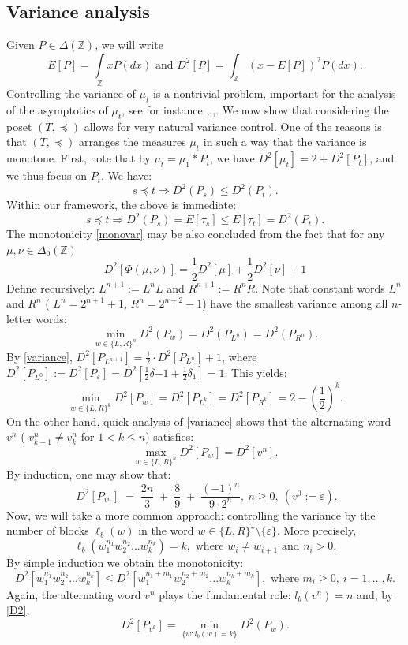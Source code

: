 \documentclass[10pt]{amsart}
\theoremstyle{definition}
\numberwithin{equation}{section}
\newcommand{\dd}{\delta}
\newcommand{\eps}{\varepsilon}
\newcommand{\Z}{\mathbb{Z}}
\begin{document}
\subsection{Variance analysis}
Given $P\in\Delta(\Z)$, we will write 
$$E[P]=\int\limits_{\Z}xP(dx)\mbox{ and }D^2[P]=\int_{\Z}(x-E[P])^2P(dx).$$
Controlling the variance  of $\mu_t$ is a nontrivial problem, important for the analysis of the asymptotics of $\mu_t$, see for instance \cite{drmota},\cite{Emme},\cite{Hosten},\cite{sw2023}. We  now show that considering the poset $(T, \preceq)$ allows for very natural variance control. One of the reasons is that $(T, \preceq)$ arranges the measures $\mu_t$ in such a way that the variance is monotone. First, note that by $\mu_t=\mu_1\ast P_t$, we have $D^2[\mu_t]=2+D^2[P_t]$, and we thus focus on $P_t$.  We have:
\begin{equation}\label{monovar}
s\preceq t \Longrightarrow D^2(P_s)\leq D^2(P_{t}).
\end{equation}
Within our framework, the above is immediate:
$$s\preceq t \Longrightarrow D^2(P_s)=E[\tau_s]\leq E[\tau_{t}]=D^2(P_{t}).$$
The monotonicity \eqref{monovar} may be also concluded from the fact that for any $\mu,\nu\in \Delta_0(\Z)$
\begin{equation}\label{variance}
D^2[\Phi(\mu,\nu)]=\frac12 D^2[\mu]+\frac12 D^2[\nu]+1
\end{equation}
Define recursively: $L^{n+1}:=L^nL$ and $R^{n+1}:=R^nR$. Note that constant words $L^n$ and $R^n$ ( $L^n= 2^{n+1}+1$, $R^n=2^{n+2}-1$)  have the smallest variance among all $n$-letter words:
$$\min\limits_{w\in\{L,R\}^n}D^2(P_{w})=D^2(P_{L^n})=D^2(P_{R^n}).$$
By \eqref{variance}, $D^2[P_{L^{n+1}}]=\frac{1}{2}\cdot D^2[P_{L^n}]+1$, where $D^2[P_{L^0}]:=D^2[P_{\eps}]=D^2[\frac12\dd{-1}+\frac12\dd_1]=1$. This yields:
\begin{equation}\label{minD}
\min\limits_{w\in \{L,R\}^k} D^2[P_w]=D^2[P_{L^k}]=D^2[P_{R^k}]=2-(\frac{1}{2})^{k}.
\end{equation}
On the other hand, quick analysis of \eqref{variance} shows that the alternating word $v^n$ ( $v^n_{k-1}\neq v^n_{k}$ for $1<k\leq n$) satisfies:
$$\max\limits_{w\in \{L,R\}^n} D^2[P_w] =D^2[v^n].$$
By induction, one may show that:
$$
 \; D^2[P_{v^n}] \;=\; \frac{2n}{3} \;+\; \frac{8}{9} \;+\; \frac{(-1)^{n}}{9\cdot 2^{n}},\ n\geq0, \ ( v^0:=\eps). $$
Now, we will take a more common approach: controlling the variance by the number of blocks $\ell_b(w)$ in the word $w\in\{L,R\}^\star\setminus\{\eps\}$. More precisely, 
$$\ell_b(w_1^{n_1}w_2^{n_2}...w_k^{n_k})=k,\mbox{ where } w_i\neq w_{i+1}\mbox{ and } n_i>0.$$  
 By simple induction we obtain the monotonicity: 
\begin{equation}\label{D2}
D^2[w_1^{n_1}w_2^{n_2}...w_k^{n_k}]\leq D^2[w_1^{n_1+m_1}w_2^{n_2+m_2}...w_k^{n_k+m_k}],\mbox{ where }m_i\geq0,\ i=1,\dots,k .
\end{equation}
Again, the alternating word $v^n$ plays the fundamental role: $l_b(v^n)=n$ and, by \eqref{D2},
$$D^2[P_{v^k}]=\min\limits_{\{w\colon l_b(w)=k\}}D^2(P_w).$$
\end{document}
